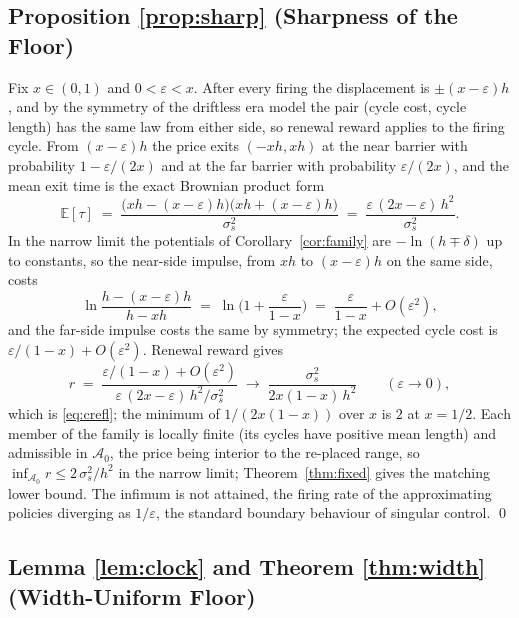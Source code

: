 \documentclass[11pt,a4paper]{article}
\theoremstyle{definition}
\theoremstyle{plain}
\theoremstyle{remark}
\begin{document}
\subsection{Proposition \ref{prop:sharp} (Sharpness of the Floor)}

Fix $x \in (0,1)$ and $0 < \varepsilon < x$. After every firing the displacement is $\pm(x - \varepsilon)h$, and by the symmetry of the driftless era model the pair (cycle cost, cycle length) has the
same law from either side, so renewal reward applies to the firing cycle. From $(x - \varepsilon)h$ the price exits $(-xh, xh)$ at the near barrier with probability $1 - \varepsilon/(2x)$ and at the far
barrier with probability $\varepsilon/(2x)$, and the mean exit time is the exact Brownian product form
\[
\mathbb{E}[\tau] \;=\; \frac{\big(xh - (x-\varepsilon)h\big)
\big(xh + (x-\varepsilon)h\big)}{\sigma_s^2}
\;=\; \frac{\varepsilon\,(2x - \varepsilon)\,h^2}{\sigma_s^2}.
\]
In the narrow limit the potentials of Corollary~\ref{cor:family} are $-\ln(h \mp \delta)$ up to constants, so the near-side impulse, from $xh$ to $(x - \varepsilon)h$ on the same side, costs
\[
\ln \frac{h - (x - \varepsilon)h}{h - xh}
\;=\; \ln\Big(1 + \frac{\varepsilon}{1 - x}\Big)
\;=\; \frac{\varepsilon}{1-x} + O(\varepsilon^2),
\]
and the far-side impulse costs the same by symmetry; the expected cycle cost is $\varepsilon/(1-x) + O(\varepsilon^2)$. Renewal reward gives
\[
r \;=\; \frac{\varepsilon/(1-x) + O(\varepsilon^2)}
{\varepsilon\,(2x - \varepsilon)\, h^2/\sigma_s^2}
\;\longrightarrow\; \frac{\sigma_s^2}{2x(1-x)\,h^2}
\qquad (\varepsilon \to 0),
\]
which is \eqref{eq:crefl}; the minimum of $1/(2x(1-x))$ over $x$ is $2$ at $x = 1/2$. Each member of the family is locally finite (its cycles have positive mean length) and admissible in
$\mathcal{A}_0$, the price being interior to the re-placed range, so $\inf_{\mathcal{A}_0} r \le 2\,\sigma_s^2/h^2$ in the narrow limit; Theorem~\ref{thm:fixed} gives the matching lower bound. The
infimum is not attained, the firing rate of the approximating policies diverging as $1/\varepsilon$, the standard boundary behaviour of singular control. \qed

\subsection{Lemma \ref{lem:clock} and Theorem \ref{thm:width}
(Width-Uniform Floor)}
\end{document}
